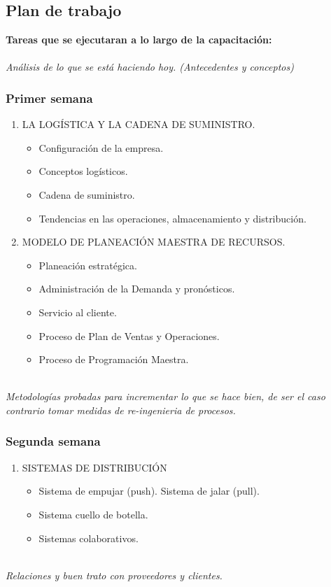 	\subsection{Plan de trabajo}
	\textbf{Tareas que se ejecutaran a lo largo de la capacitación:\\\\}
	\textit{Análisis de lo que se está haciendo hoy. (Antecedentes y conceptos)}
		\subsubsection{Primer semana}
			\begin{enumerate}
				\item LA LOGÍSTICA Y LA CADENA DE SUMINISTRO.
				\begin{itemize}
					\item Configuración de la empresa.
					\item Conceptos logísticos.
					\item Cadena de suministro.
					\item Tendencias en las operaciones, almacenamiento y distribución.
				\end{itemize}
				\item MODELO DE PLANEACIÓN MAESTRA DE RECURSOS.
				\begin{itemize}
					\item Planeación estratégica.
					\item Administración de la Demanda y pronósticos.
					\item Servicio al cliente.
					\item Proceso de Plan de Ventas y Operaciones.
					\item Proceso de Programación Maestra.
				\end{itemize}
			\end{enumerate}
		\textit{ \\Metodologías probadas para incrementar lo que se hace bien, de ser el caso contrario tomar medidas de re-ingenieria de procesos.}
		\subsubsection{Segunda semana}	
		 	\begin{enumerate}
				\item SISTEMAS DE DISTRIBUCIÓN
				\begin{itemize}
					\item Sistema de empujar (push). Sistema de jalar (pull).
					\item Sistema cuello de botella.
					\item Sistemas colaborativos.
				\end{itemize}
			\end{enumerate}
		\textit{ \\Relaciones y buen trato con proveedores y clientes.}
